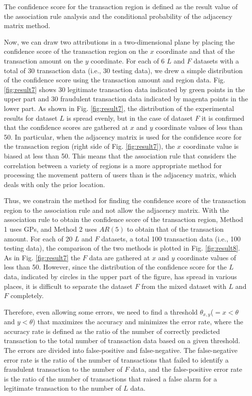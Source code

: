 \documentclass[final,authoryear,5p,times,twocolumn]{elsarticle}
\begin{document}
The confidence score for the transaction region is defined as the result value of the association rule analysis and the conditional probability of the adjacency matrix method.

Now, we can draw two attributions in a two-dimensional plane by placing the confidence score of the transaction region on the $x$ coordinate and that of the transaction amount on the $y$ coordinate. For each of 6 $L$ and $F$ datasets with a total of 30 transaction data (i.e., 30 testing data), we drew a simple distribution of the confidence score using the transaction amount and region data. Fig. \ref{fig:result7} shows 30 legitimate transaction data indicated by green points in the upper part and 30 fraudulent transaction data indicated by magenta points in the lower part. As shown in Fig. \ref{fig:result7}, the distribution of the experimental results for dataset $L$ is spread evenly, but in the case of dataset $F$ it is confirmed that the confidence scores are gathered at $x$ and $y$ coordinate values of less than 50. In particular, when the adjacency matrix is used for the confidence score for the transaction region (right side of Fig. \ref{fig:result7}), the $x$ coordinate value is biased at less than 50. This means that the association rule that considers the correlation between a variety of regions is a more appropriate method for processing the movement pattern of users than is the adjacency matrix, which deals with only the prior location.

Thus, we constrain the method for finding the confidence score of the transaction region to the association rule and not allow the adjacency matrix. With the association rule to obtain the confidence score of the transaction region, Method 1 uses GPs, and Method 2 uses $AR(5)$ to obtain that of the transaction amount. For each of 20 $L$ and $F$ datasets, a total 100 transaction data (i.e., 100 testing data), the comparison of the two methods is plotted in Fig. \ref{fig:result8}. As in Fig. \ref{fig:result7} the $F$ data are gathered at $x$ and $y$ coordinate values of less than 50. However, since the distribution of the confidence score for the $L$ data, indicated by circles in the upper part of the figure, has spread in various places, it is difficult to separate the dataset $F$ from the mixed dataset with $L$ and $F$ completely.

Therefore, even allowing some errors, we need to find a threshold $\theta_{x,y}$($=x<\theta$ and $y< \theta$) that maximizes the accuracy and minimizes the error rate, where the accuracy rate is defined as the ratio of the number of correctly predicted transaction to the total number of transaction data based on a given threshold. The errors are divided into false-positive and false-negative. The false-negative error rate is the ratio of the number of transactions that failed to identify a fraudulent transaction to the number of $F$ data, and the false-positive error rate is the ratio of the number of transactions that raised a false alarm for a legitimate transaction to the number of $L$ data.
\end{document}
